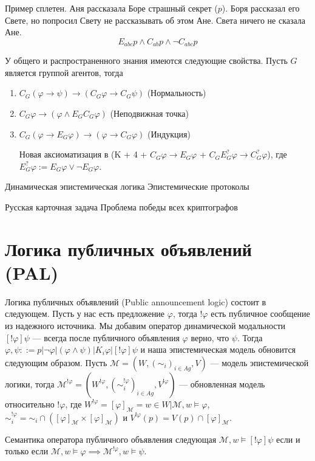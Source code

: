 \documentclass[openany]{book}
\theoremstyle{plain}
\theoremstyle{definition}
\begin{document}
Пример сплетен. Аня рассказала Боре страшный секрет (\(p\)). Боря рассказал его Свете, но попросил Свету не рассказывать об этом Ане. Света ничего не сказала Ане.
\[E_{abc} p \land C_{ab} p \land \neg C_{abc} p\]

У общего и распространенного знания имеются следующие свойства. Пусть $G$ является группой агентов, тогда
\begin{enumerate}
\item \(C_G (\varphi \to \psi) \to (C_G \varphi \to C_G \psi)\) (Нормальность)
\item \(C_G \varphi \to (\varphi \land E_G C_G \varphi)\) (Неподвижная точка)
\item \(C_G (\varphi \to E_G \varphi) \to (\varphi \to C_G \varphi)\) (Индукция)

Новая аксиоматизация в \cite{Herzig} (K + 4 + \(C_G \varphi \to E_G \varphi\) + \(C_G E_G^? \varphi \to C_G^? \varphi\)), где \(E_G^? \varphi := E_G \varphi \lor \neg E_G \varphi\).
\end{enumerate}

Динамическая эпистемическая логика
Эпистемические протоколы

Русская карточная задача
Проблема победы всех криптографов

\section{Логика публичных объявлений (PAL)}

Логика публичных объявлений (Public announcement logic) состоит в следующем. Пусть у нас есть предложение \(\varphi\), тогда \(!\varphi\) есть публичное сообщение из надежного источника. Мы добавим оператор динамической модальности \([!\varphi]\psi\) --- всегда после публичного объявления \(\varphi\) верно, что \(\psi\). Тогда \(\varphi, \psi ::= p | \neg \varphi | (\varphi \land \psi) | K_i \varphi | [!\varphi] \psi\) и наша эпистемическая модель обновится следующим образом. Пусть \(\mathcal{M} = (W, (\sim_i)_{i \in Ag}, V)\) --- модель эпистемической логики, тогда \(\mathcal{M}^{!\varphi} = (W^{!\varphi}, (\sim_{i}^{!\varphi})_{i \in Ag}, V^{!\varphi})\) --- обновленная модель относительно \(!\varphi\), где \(W^{!\varphi} = [\varphi]_{\mathcal{M}} = {w \in W | \mathcal{M}, w \models \varphi}\), \(\sim_i^{!\varphi} = \sim_i \cap ([\varphi]_{\mathcal{M}} \times [\varphi]_{\mathcal{M}})\) и \(V^{!\varphi} (p) = V(p) \cap [\varphi]_{\mathcal{M}}\). 

Семантика оператора публичного объявления следующая \(\mathcal{M}, w \models [!\varphi] \psi\) если и только если \(\mathcal{M}, w \models \varphi \implies \mathcal{M}^{!\varphi}, w \models \psi\).
\end{document}
